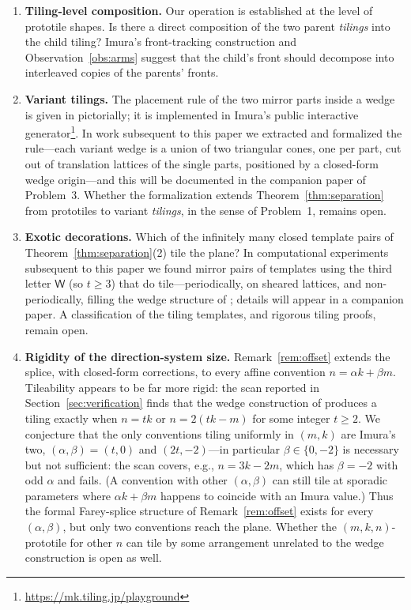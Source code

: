 \documentclass[11pt]{article}
\theoremstyle{remark}
\theoremstyle{definition}
\newcommand{\Wt}{\mathsf{W}}
\begin{document}
\begin{enumerate}
\item \textbf{Tiling-level composition.} Our operation is established at the level of
prototile shapes. Is there a direct composition of the two parent \emph{tilings} into the
child tiling? Imura's front-tracking construction \cite{Imura2025} and
Observation~\ref{obs:arms} suggest that the child's front should decompose into
interleaved copies of the parents' fronts.
\item \textbf{Variant tilings.} The placement rule of the two mirror parts inside a
wedge is given in \cite{Imura2026} pictorially; it is implemented in Imura's public
interactive generator\footnote{\url{https://mk.tiling.jp/playground}}. In work
subsequent to this paper we extracted and formalized the rule---each variant wedge
is a union of two triangular cones, one per part, cut out of translation lattices
of the single parts, positioned by a closed-form wedge origin---and this will be
documented in the companion paper of Problem~3. Whether the formalization extends
Theorem~\ref{thm:separation} from prototiles to variant \emph{tilings}, in the
sense of Problem~1, remains open.
\item \textbf{Exotic decorations.} Which of the infinitely many closed template pairs
of Theorem~\ref{thm:separation}(2) tile the plane? In computational experiments
subsequent to this paper we found mirror pairs of templates using the third letter
$\Wt$ (so $t\ge3$) that do tile---periodically, on sheared lattices, and
non-periodically, filling the wedge structure of \cite{Imura2026}; details will appear
in a companion paper. A classification of the tiling templates, and rigorous tiling
proofs, remain open.
\item \textbf{Rigidity of the direction-system size.} Remark~\ref{rem:offset} extends
the splice, with closed-form corrections, to every affine convention
$n=\alpha k+\beta m$. Tileability appears to be far more rigid: the scan reported in
Section~\ref{sec:verification} finds that the wedge construction of \cite{Imura2025}
produces a tiling exactly when
$n=tk$ or $n=2(tk-m)$ for some integer $t\ge2$. We conjecture that the only
conventions tiling uniformly in $(m,k)$ are Imura's two, $(\alpha,\beta)=(t,0)$ and
$(2t,-2)$---in particular $\beta\in\{0,-2\}$ is necessary but not sufficient: the
scan covers, e.g., $n=3k-2m$, which has $\beta=-2$ with odd $\alpha$ and fails. (A
convention with other $(\alpha,\beta)$ can still tile at sporadic parameters where
$\alpha k+\beta m$ happens to coincide with an Imura value.) Thus the formal
Farey-splice structure of Remark~\ref{rem:offset} exists for every $(\alpha,\beta)$,
but only two conventions reach the plane. Whether the $(m,k,n)$-prototile for other
$n$ can tile by some arrangement unrelated to the wedge construction is open as
well.
\end{enumerate}
\end{document}

